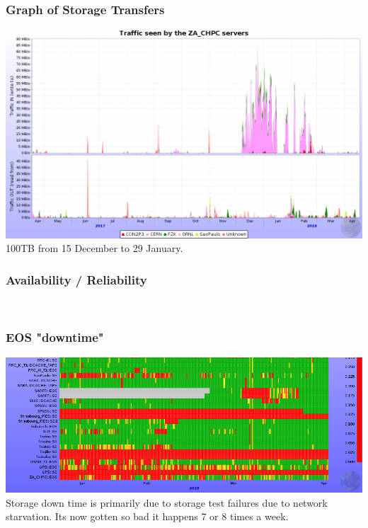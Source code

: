 \documentclass{beamer}
\begin{document}
\begin{frame}
    \frametitle{Graph of Storage Transfers}
    \includegraphics[scale=0.25]{StorageTrafficInandOut.png}
    100TB from 15 December to 29 January.
\end{frame}
\begin{frame}
  \frametitle{Availability / Reliability}
    \newline
    \\
\vspace{0.5cm}
\end{frame}
\begin{frame}
    \frametitle{EOS "downtime"}
    \includegraphics[scale=0.25]{EOS-Status-3monthsa.png} \\
Storage down time is primarily due to storage test failures due to network starvation. Its now gotten so bad it happens 7 or 8 times a week.
\end{frame}
\end{document}

